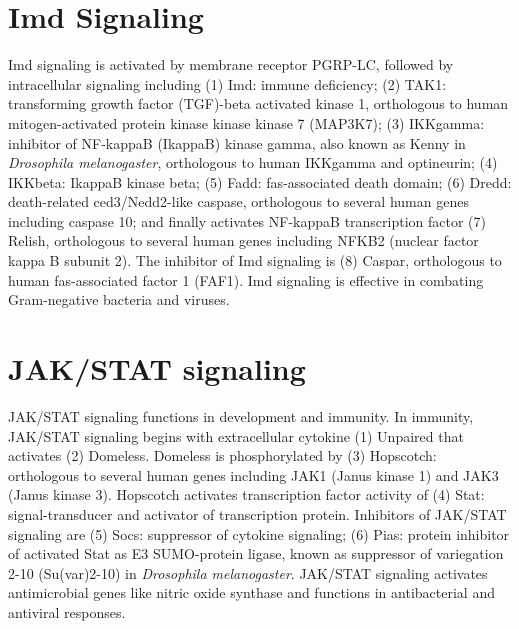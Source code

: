 \documentclass[11pt]{article}
\begin{document}
\begin{sloppypar}
\section{Imd Signaling}
Imd signaling is activated by membrane receptor PGRP-LC, followed by intracellular signaling including 
\newline
(1) Imd: immune deficiency; \newline
(2) TAK1: transforming growth factor (TGF)-beta activated kinase 1, orthologous to human mitogen-activated protein kinase kinase kinase 7 (MAP3K7); \newline
(3) IKKgamma: inhibitor of NF-kappaB (IkappaB) kinase gamma, also known as Kenny in \textit{Drosophila melanogaster}, orthologous to human IKKgamma and optineurin; \newline
(4) IKKbeta: IkappaB kinase beta; \newline
(5) Fadd: fas-associated death domain; \newline
(6) Dredd: death-related ced3/Nedd2-like caspase, orthologous to several human genes including caspase 10; \newline
and finally activates NF-kappaB transcription factor 
\newline
(7) Relish, orthologous to several human genes including NFKB2 (nuclear factor kappa B subunit 2). \newline
The inhibitor of Imd signaling is 
\newline
(8) Caspar, orthologous to human fas-associated factor 1 (FAF1). \newline
Imd signaling is effective in combating Gram-negative bacteria and viruses. 

\section{JAK/STAT signaling}
JAK/STAT signaling functions in development and immunity. 
In immunity, JAK/STAT signaling begins with extracellular cytokine 
\newline
(1) Unpaired \newline
that activates 
\newline
(2) Domeless. \newline
Domeless is phosphorylated by 
\newline
(3) Hopscotch: orthologous to several human genes including JAK1 (Janus kinase 1) and JAK3 (Janus kinase 3). \newline
Hopscotch activates transcription factor activity of 
\newline
(4) Stat: signal-transducer and activator of transcription protein. \newline
Inhibitors of JAK/STAT signaling are 
\newline
(5) Socs: suppressor of cytokine signaling; \newline
(6) Pias: protein inhibitor of activated Stat as E3 SUMO-protein ligase, known as suppressor of variegation 2-10 (Su(var)2-10) in \textit{Drosophila melanogaster}. \newline
JAK/STAT signaling activates antimicrobial genes like nitric oxide synthase and functions in antibacterial and antiviral responses. 


\end{sloppypar}
\end{document}
